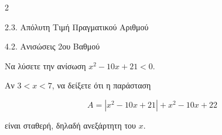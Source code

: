 \begin{ylh}{2}
    \item 2.3. Απόλυτη Τιμή Πραγματικού Αριθμού
    \item 4.2. Ανισώσεις 2ου Βαθμού
\end{ylh}

\begin{alist}
\item Να λύσετε την ανίσωση $x^{2} - 10x + 21 < 0$.
\item Αν $3 < x < 7$, να δείξετε ότι η παράσταση

\begin{equation*}
A = \left| x^{2} - 10x + 21 \right| + x^{2} - 10x + 22
\end{equation*}

είναι σταθερή, δηλαδή ανεξάρτητη του $x$.
\end{alist}

